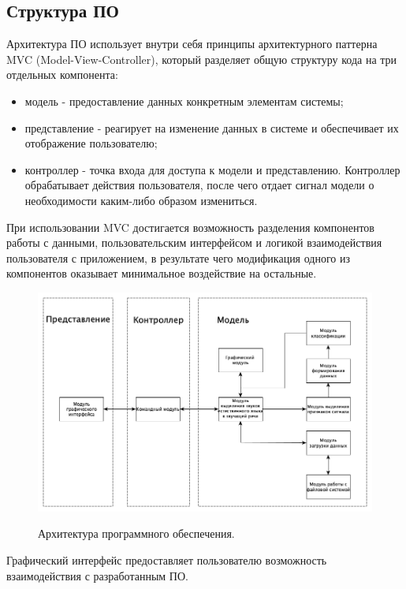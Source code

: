 \documentclass[utf8x, 14pt, oneside, a4paper]{article}
\begin{document}
	
	\subsection{Структура ПО}
	
	Архитектура ПО использует внутри себя принципы архитектурного паттерна MVC (Model-View-Controller), который разделяет общую структуру кода на три отдельных компонента:
	\begin{itemize}
		\item модель - предоставление данных конкретным элементам системы;
		\item представление - реагирует на изменение данных в системе и обеспечивает их отображение пользователю;
		\item контроллер - точка входа для доступа к модели и представлению. Контроллер обрабатывает действия пользователя, после чего отдает сигнал модели о необходимости каким-либо образом измениться.
	\end{itemize}

	При использовании MVC достигается возможность разделения компонентов работы с данными, пользовательским интерфейсом и логикой взаимодействия пользователя с приложением, в результате чего модификация одного из компонентов оказывает минимальное воздействие на остальные.
	
	\begin{figure}[h!]
		\begin{center}
			{\includegraphics[scale = 0.5]{img/mvc.png}}
		\end{center}
		\caption{Архитектура программного обеспечения.}
		\label{ris:mvc}
	\end{figure}

	Графический интерфейс предоставляет пользователю возможность взаимодействия с разработанным ПО. 
	
\end{document}
